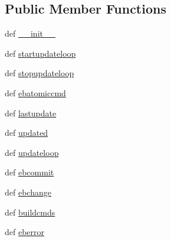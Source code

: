 \subsection*{Public Member Functions}
\begin{DoxyCompactItemize}
\item 
def \hyperlink{classcore_1_1netns_1_1vnet_1_1_ebtables_queue_a221fab62e74d2102cd5ef1d98d511878}{\+\_\+\+\_\+init\+\_\+\+\_\+}
\item 
def \hyperlink{classcore_1_1netns_1_1vnet_1_1_ebtables_queue_a4438171e6274e0511c2d025531e63547}{startupdateloop}
\item 
def \hyperlink{classcore_1_1netns_1_1vnet_1_1_ebtables_queue_a8e11dad3e790c85ac24a0e6f311f741b}{stopupdateloop}
\item 
def \hyperlink{classcore_1_1netns_1_1vnet_1_1_ebtables_queue_ac1566d88eccd1f6bd7ecad8c06f833eb}{ebatomiccmd}
\item 
def \hyperlink{classcore_1_1netns_1_1vnet_1_1_ebtables_queue_a54d83d32c237ba6f2ca0d184b118fcdc}{lastupdate}
\item 
def \hyperlink{classcore_1_1netns_1_1vnet_1_1_ebtables_queue_aef7565ab89d78140208d36878f7b7715}{updated}
\item 
def \hyperlink{classcore_1_1netns_1_1vnet_1_1_ebtables_queue_a4cbc734b0ee2103986215a237f9f242b}{updateloop}
\item 
def \hyperlink{classcore_1_1netns_1_1vnet_1_1_ebtables_queue_a76cf1b09084c646995f7dc4f0edfbc15}{ebcommit}
\item 
def \hyperlink{classcore_1_1netns_1_1vnet_1_1_ebtables_queue_a1a62a5ab1242aa4baed3db449b5955b3}{ebchange}
\item 
def \hyperlink{classcore_1_1netns_1_1vnet_1_1_ebtables_queue_af584abfa320df6b0aa2d9d9cb24d2ae0}{buildcmds}
\item 
def \hyperlink{classcore_1_1netns_1_1vnet_1_1_ebtables_queue_a389ff0060a5156b5f62f5a3e36d06bea}{eberror}
\end{DoxyCompactItemize}
